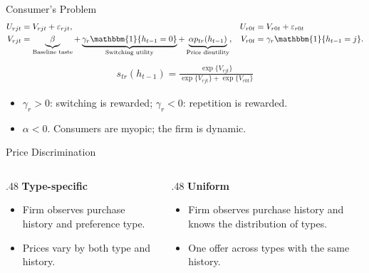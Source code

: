 \documentclass[aspectratio=169,professionalfonts]{beamer}
\newcommand{\shortbuttons}{}
\begin{document}
\gdef\shortbuttons{}
\begin{frame}[label=short-7]{Consumer's Problem}
  \begingroup
  \setlength{\jot}{7pt}
    \begin{align*}
      U_{rjt} &= V_{rjt} 
      + \varepsilon_{rjt},
      & U_{r0t} &= V_{r0t} 
      + \varepsilon_{r0t} \\
      V_{rjt} &= \underbrace{\beta}_{\text{Baseline taste}}
        + \underbrace{\gamma_r\mathbbm{1}\{h_{t-1}=0\}}_{\text{Switching utility}}
        + \underbrace{\alpha p_{tr}(h_{t-1})}_{\text{Price disutility}},
        & V_{r0t} &= \gamma_r\mathbbm{1}\{h_{t-1}=j\}.
    \end{align*}
    \begin{gather*}
      s_{tr}(h_{t-1}) = \frac{\exp\{V_{rjt}\}}{\exp\{V_{rjt}\} + \exp\{V_{r0t}\}}
    \end{gather*}
  \endgroup
  \begin{itemize}\setlength{\itemsep}{2pt}
    \item $\gamma_r>0$: switching is rewarded; $\gamma_r<0$: repetition is rewarded.
    \item $\alpha<0$. Consumers are myopic; the firm is dynamic.
  \end{itemize}
\end{frame}

\gdef\shortbuttons{}
\begin{frame}[label=short-18]{Price Discrimination}
  \small
  \begin{columns}[T,onlytextwidth]
    \begin{column}{.48\textwidth}
      \small\textbf{Type-specific}
      \begin{itemize}
        \item Firm observes purchase history and preference type.
        \item Prices vary by both type and history.
      \end{itemize}
    \end{column}
    \begin{column}{.48\textwidth}
      \small\textbf{Uniform}
      \begin{itemize}
        \item Firm observes purchase history and knows the distribution of types.
        \item One offer across types with the same history.
      \end{itemize}
    \end{column}
  \end{columns}
\end{frame}
\end{document}
